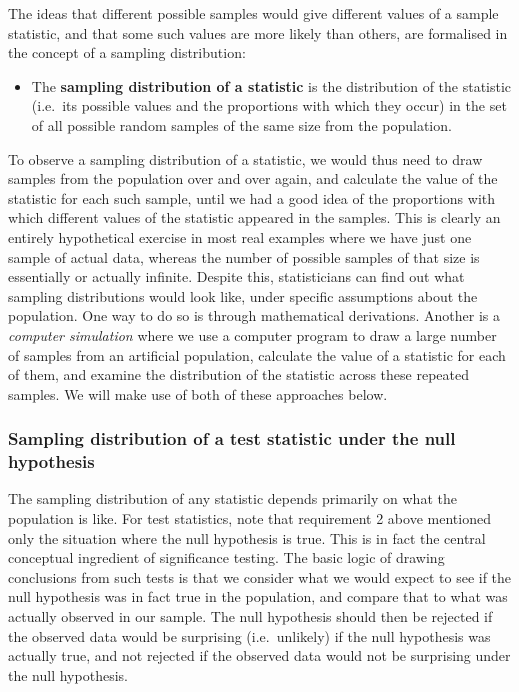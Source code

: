 \documentclass[11pt,a4paper,openany]{book}
\providecommand{\tightlist}{%
  \setlength{\itemsep}{0pt}\setlength{\parskip}{0pt}}
\begin{document}
The ideas that different possible samples would give different values of
a sample statistic, and that some such values are more likely than
others, are formalised in the concept of a sampling distribution:

\begin{itemize}
\tightlist
\item
  The \textbf{sampling distribution of a statistic} is the distribution
  of the statistic (i.e.~its possible values and the proportions with
  which they occur) in the set of all possible random samples of the
  same size from the population.
\end{itemize}

To observe a sampling distribution of a statistic, we would thus need to
draw samples from the population over and over again, and calculate the
value of the statistic for each such sample, until we had a good idea of
the proportions with which different values of the statistic appeared in
the samples. This is clearly an entirely hypothetical exercise in most
real examples where we have just one sample of actual data, whereas the
number of possible samples of that size is essentially or actually
infinite. Despite this, statisticians can find out what sampling
distributions would look like, under specific assumptions about the
population. One way to do so is through mathematical derivations.
Another is a \emph{computer simulation} where we use a computer program
to draw a large number of samples from an artificial population,
calculate the value of a statistic for each of them, and examine the
distribution of the statistic across these repeated samples. We will
make use of both of these approaches below.

\subsubsection*{Sampling distribution of a test statistic under the null
hypothesis}\label{sampling-distribution-of-a-test-statistic-under-the-null-hypothesis}

The sampling distribution of any statistic depends primarily on what the
population is like. For test statistics, note that requirement 2 above
mentioned only the situation where the null hypothesis is true. This is
in fact the central conceptual ingredient of significance testing. The
basic logic of drawing conclusions from such tests is that we consider
what we would expect to see if the null hypothesis was in fact true in
the population, and compare that to what was actually observed in our
sample. The null hypothesis should then be rejected if the observed data
would be surprising (i.e.~unlikely) if the null hypothesis was actually
true, and not rejected if the observed data would not be surprising
under the null hypothesis.
\end{document}
